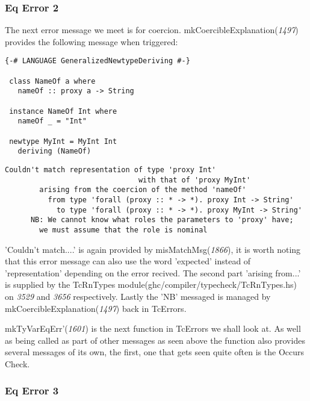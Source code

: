 \documentclass[a4paper]{article}
\begin{document}
\subsubsection{Eq Error 2}

The next error message we meet is for coercion. mkCoercibleExplanation(\textit{1497}) provides the following message when triggered: 

\begin{lstlisting}[label={lst: T8.0}, numbers=none, caption={Example Program \cite{ex8}}]
{-# LANGUAGE GeneralizedNewtypeDeriving #-}

 class NameOf a where
   nameOf :: proxy a -> String

 instance NameOf Int where
   nameOf _ = "Int"

 newtype MyInt = MyInt Int
   deriving (NameOf) 
\end{lstlisting}

\begin{lstlisting}[label={lst: T8.0.2}, numbers=none, caption={Error}]
Couldn't match representation of type 'proxy Int'
                               with that of 'proxy MyInt'
        arising from the coercion of the method 'nameOf'
          from type 'forall (proxy :: * -> *). proxy Int -> String'
            to type 'forall (proxy :: * -> *). proxy MyInt -> String'
      NB: We cannot know what roles the parameters to 'proxy' have;
        we must assume that the role is nominal
\end{lstlisting}

'Couldn't match....' is again provided by misMatchMsg(\textit{1866}), it is worth noting that this error message can also use the word 'expected' instead of 'representation' depending on the error recived. The second part 'arising from...' is supplied by the TcRnTypes module(ghc/compiler/typecheck/TcRnTypes.hs) on \textit{3529} and \textit{3656} respectively. Lastly the 'NB' messaged is managed by mkCoercibleExplanation(\textit{1497}) back in TcErrors.

mkTyVarEqErr'(\textit{1601}) is the next function in TcErrors we shall look at. As well as being called as part of other messages as seen above the function also provides several messages of its own, the first, one that gets seen quite often is the Occurs Check.

\subsubsection{Eq Error 3}
\end{document}

